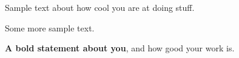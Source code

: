 \documentclass[12pt]{ministate}
\begin{document}
\runninghead

\thispagestyle{fancy}

Sample text about how cool you are at doing stuff.

Some more sample text. 

\textbf{A bold statement about you}, and how good your work is.


\end{document}
